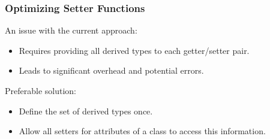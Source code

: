 \begin{frame}
    \frametitle{Optimizing Setter Functions}
    
    An issue with the current approach:
    \begin{itemize}
      \item Requires providing all derived types to each getter/setter pair.
      \item Leads to significant overhead and potential errors.
    \end{itemize}
    \pause 
    Preferable solution:
    \begin{itemize}
      \item Define the set of derived types once.
      \item Allow all setters for attributes of a class to access this information.
    \end{itemize}
\end{frame}